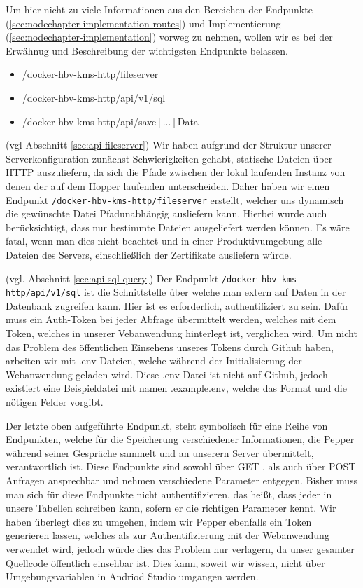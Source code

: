 Um hier nicht zu viele Informationen aus den Bereichen der Endpunkte (\ref{sec:nodechapter-implementation-routes}) und Implementierung (\ref{sec:nodechapter-implementation}) vorweg zu nehmen,
wollen wir es bei der Erwähnug und Beschreibung der wichtigsten Endpunkte belassen.

\begin{itemize}
    \item /docker-hbv-kms-http/fileserver
    \item /docker-hbv-kms-http/api/v1/sql
    \item /docker-hbv-kms-http/api/save$\left[...\right]$Data
\end{itemize}

(vgl Abschnitt \ref{sec:api-fileserver}) Wir haben aufgrund der Struktur unserer Serverkonfiguration zunächst Schwierigkeiten gehabt, statische
Dateien über HTTP auszuliefern, da sich die Pfade zwischen der lokal laufenden Instanz von denen der
auf dem Hopper laufenden unterscheiden. Daher haben wir einen Endpunkt \verb|/docker-hbv-kms-http/fileserver| erstellt, welcher uns
dynamisch die gewünschte Datei Pfadunabhängig ausliefern kann. Hierbei wurde auch berücksichtigt, dass
nur bestimmte Dateien ausgeliefert werden können. Es wäre fatal, wenn man dies nicht beachtet und
in einer Produktivumgebung alle Dateien des Servers, einschließlich der Zertifikate ausliefern würde.

(vgl. Abschnitt \ref{sec:api-sql-query}) Der Endpunkt \verb|/docker-hbv-kms-http/api/v1/sql| ist die Schnittstelle über welche man extern auf Daten in der
Datenbank zugreifen kann. Hier ist es erforderlich, authentifiziert zu sein.
Dafür muss ein Auth-Token bei jeder Abfrage übermittelt werden, welches mit dem Token, welches in
unserer Vebanwendung hinterlegt ist, verglichen wird. Um nicht das Problem des öffentlichen
Einsehens unseres Tokens durch Github haben, arbeiten wir mit .env Dateien, welche während der Initialisierung der Webanwendung geladen wird.
Diese .env Datei ist nicht auf Github, jedoch existiert eine Beispieldatei mit namen .example.env, welche das Format und die
nötigen Felder vorgibt.

Der letzte oben aufgeführte Endpunkt, steht symbolisch für eine Reihe von Endpunkten, welche
für die Speicherung verschiedener Informationen, die Pepper während seiner Gespräche sammelt und an unserern Server übermittelt,
verantwortlich ist. Diese Endpunkte sind sowohl über GET , als auch über POST Anfragen ansprechbar und nehmen verschiedene Parameter entgegen.
Bisher muss man sich für diese Endpunkte nicht authentifizieren, das heißt, dass jeder in unsere Tabellen schreiben kann, sofern
er die richtigen Parameter kennt.
Wir haben überlegt dies zu umgehen, indem wir Pepper ebenfalls ein Token generieren lassen, welches als zur Authentifizierung
mit der Webanwendung verwendet wird, jedoch würde dies das Problem nur verlagern, da unser gesamter Quellcode öffentlich einsehbar ist.
Dies kann, soweit wir wissen, nicht über Umgebungsvariablen in Andriod Studio umgangen werden.

